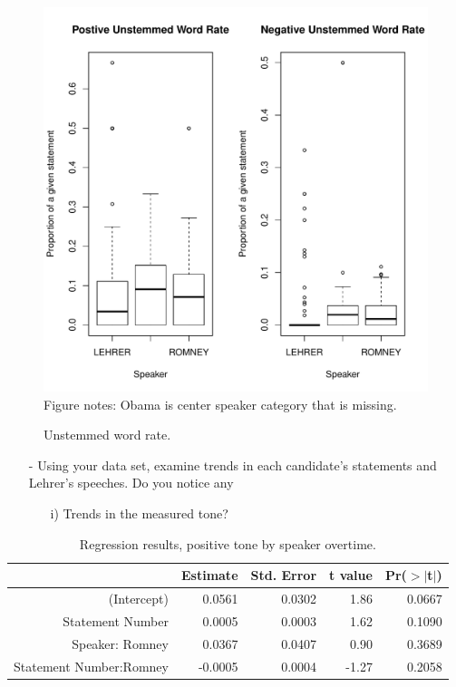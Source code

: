 \documentclass[12pt,letterpaper]{article}
\begin{document}
\begin{figure}[H]
  \caption{\footnotesize{Unstemmed word rate.}}
  \centering
   \includegraphics[width=.65\linewidth]{HW1wordRatePlot.pdf}\\
    \footnotesize{Figure notes: Obama is center speaker category that is missing.}
\end{figure}

\begin{itemize}
\item[-] Using your data set, examine trends in each candidate's statements and Lehrer's speeches.  Do you notice any
\begin{itemize}
\item[i)] Trends in the measured tone?
\end{itemize}
\end{itemize}



\begin{table}[H]
\centering
  \caption{\footnotesize{Regression results, positive tone by speaker overtime.}}
\begin{tabular}{rrrrr}
  \hline
 & Estimate & Std. Error & t value & Pr($>$$|$t$|$) \\ 
  \hline
(Intercept) & 0.0561 & 0.0302 & 1.86 & 0.0667 \\ 
  Statement Number & 0.0005 & 0.0003 & 1.62 & 0.1090 \\ 
  Speaker: Romney & 0.0367 & 0.0407 & 0.90 & 0.3689 \\ 
  Statement Number:Romney& -0.0005 & 0.0004 & -1.27 & 0.2058 \\ 
   \hline
\end{tabular}
\end{table}
\end{document}
